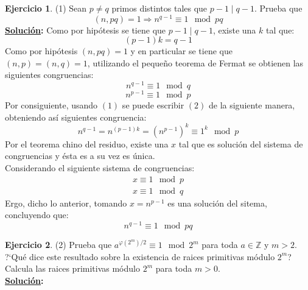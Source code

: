 \documentclass[11pt,letterpaper]{article}
\theoremstyle{definition}\newtheorem{p}{Ejercicio}
\newcommand{\Z}{\mathbb{Z}}
\newcommand{\ent}{\Longrightarrow}
\newcommand{\sol}{\textbf{\underline{Solución}: }} %
\begin{document}
\begin{p}(1)
Sean $p\neq q$ primos distintos tales que $p-1\mid q-1$. Prueba que
    \[
      (n,pq)=1 \ent n^{q-1}\equiv 1\mod pq
    \]
\sol Como por hipótesis se tiene que $p-1\mid q-1$, existe una $k$ tal que:
\begin{equation*}
  (p-1)k = q-1  \tag{1}
\end{equation*}
Como por hipótesis $(n,pq)=1$ y en particular se tiene que $(n,p) = (n,q)=1$, utilizando el
pequeño teorema de Fermat se obtienen las siguientes congruencias:
\begin{equation*}
  n^{q-1} \equiv 1 \mod q \tag{2}
\end{equation*}
\begin{equation*}
  n^{p-1} \equiv 1 \mod p \tag{3}
\end{equation*}
Por consiguiente, usando $(1)$ se puede escribir $(2)$ de la siguiente manera, obteniendo 
así siguientes congruencia:
\begin{equation*}
  n^{q-1} = n^{(p-1)k} = (n^{p-1})^k \equiv 1^k \mod p \tag{4}
\end{equation*}
Por el teorema chino del residuo, existe una $x$ tal que es solución del sistema de congruencias
y ésta es a su vez es única.\\
Considerando el siguiente sistema de congruencias:
\begin{align*}
  x \equiv 1 \mod p\\
  x \equiv 1 \mod q
\end{align*}
Ergo, dicho lo anterior, tomando $x=n^{p-1}$ es una solución del sitema, concluyendo que:
$$n^{q-1} \equiv 1\mod pq$$
\end{p}


\begin{p}(2)
Prueba que $a^{\varphi(2^m)/2}\equiv 1\mod 2^m$ para toda $a\in\Z$ y $m>2$. ?`Qu\'e dice este
resultado sobre la existencia de raices primitivas m\'odulo $2^m$? Calcula las raices primitivas
m\'odulo $2^m$ para toda $m>0$.\\
\sol

\end{p}
\end{document}
